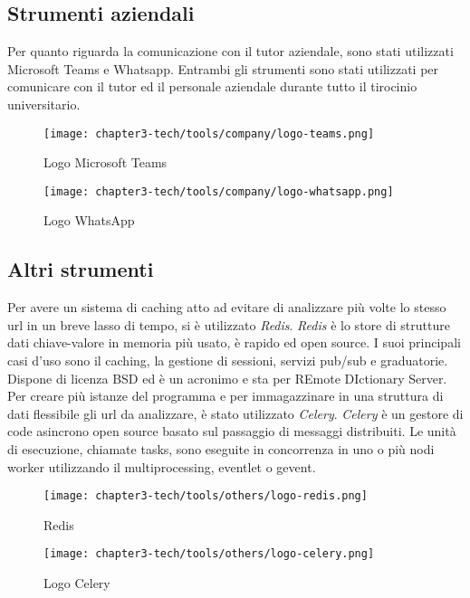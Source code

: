 \subsection{Strumenti aziendali}

Per quanto riguarda la comunicazione con il tutor aziendale, sono stati utilizzati Microsoft Teams e Whatsapp. Entrambi gli strumenti sono stati utilizzati per comunicare con il tutor ed il personale aziendale durante tutto il tirocinio universitario.

\begin{figure}[!h]
    \begin{minipage}{.5\textwidth} 
        \centering 
        \texttt{[image: chapter3-tech/tools/company/logo-teams.png]} 
        \caption{Logo Microsoft Teams} 
        \label{fig:teams} 
    \end{minipage}%
    \begin{minipage}{.5\textwidth} 
        \centering 
        \texttt{[image: chapter3-tech/tools/company/logo-whatsapp.png]} 
        \caption{Logo WhatsApp} 
        \label{fig:whatsapp} 
    \end{minipage}  
\end{figure}

\subsection{Altri strumenti}

Per avere un sistema di caching atto ad evitare di analizzare più volte lo stesso url in un breve lasso di tempo, si è utilizzato \textit{Redis}. \textit{Redis} è lo store di strutture dati chiave-valore in memoria più usato, è rapido ed open source. I suoi principali casi d'uso sono il caching, la gestione di sessioni, servizi pub/sub e graduatorie. Dispone di licenza BSD ed è un acronimo e sta per REmote DIctionary Server.
Per creare più istanze del programma e per immagazzinare in una struttura di dati flessibile gli url da analizzare, è stato utilizzato \textit{Celery}. \textit{Celery} è un gestore di code asincrono open source basato sul passaggio di messaggi distribuiti. Le unità di esecuzione, chiamate tasks, sono eseguite in concorrenza in uno o più nodi worker utilizzando il multiprocessing, eventlet o gevent.
\begin{figure}[!h]
    \begin{minipage}{.5\textwidth} 
        \centering 
        \texttt{[image: chapter3-tech/tools/others/logo-redis.png]} 
        \caption{Redis} 
        \label{fig:redis} 
    \end{minipage}%
    \begin{minipage}{.5\textwidth} 
        \centering 
        \texttt{[image: chapter3-tech/tools/others/logo-celery.png]} 
        \caption{Logo Celery} 
        \label{fig:celery} 
    \end{minipage}%
\end{figure}

